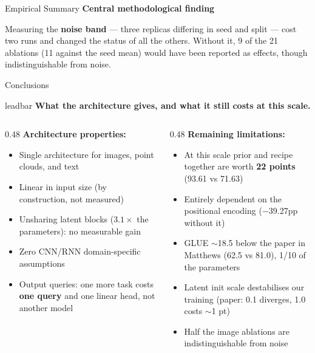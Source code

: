 \documentclass[aspectratio=169,11pt]{beamer}
\newcommand{\lead}[1]{%
  \begin{beamercolorbox}[wd=\textwidth,sep=5pt,center]{leadbar}%
    \small\bfseries #1%
  \end{beamercolorbox}\vspace{0.6em}}
\newcommand{\colhead}[1]{{\color{HeadBlue}\bfseries #1}\par\vspace{0.25em}}
\begin{document}
\begin{frame}[shrink=29]{Empirical Summary}
  \vspace{0.5em}
  \colhead{Central methodological finding}
    Measuring the \textbf{noise band} --- three replicas differing in seed and split --- cost two runs and changed the status of all the others. Without it, 9 of the 21 ablations (11 against the seed mean) would have been reported as effects, though indistinguishable from noise.
  
\end{frame}

\begin{frame}[shrink=21]{Conclusions}
  \lead{What the architecture gives, and what it still costs at this scale.}
  \begin{columns}[T]
    \begin{column}{0.48\textwidth}
      \textbf{Architecture properties:}
      \begin{itemize}
        \item Single architecture for images, point clouds, and text
        \item Linear in input size (by construction, not measured)
        \item Unsharing latent blocks ($3.1\times$ the parameters): no measurable gain
        \item Zero CNN/RNN domain-specific assumptions
        \item Output queries: one more task costs \textbf{one query} and one linear head, not another model
      \end{itemize}
    \end{column}
    \begin{column}{0.48\textwidth}
      \textbf{Remaining limitations:}
      \begin{itemize}
        \item At this scale prior and recipe together are worth \textbf{22 points} (93.61 vs 71.63)
        \item Entirely dependent on the positional encoding ($-$39.27pp without it)
        \item GLUE $\sim$18.5 below the paper in Matthews (62.5 vs 81.0), 1/10 of the parameters
        \item Latent init scale destabilises our training (paper: 0.1 diverges, 1.0 costs $\sim$1 pt)
        \item Half the image ablations are indistinguishable from noise
      \end{itemize}
    \end{column}
  \end{columns}


\end{frame}
\end{document}
